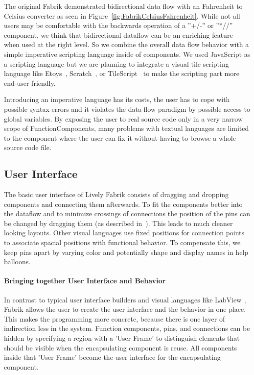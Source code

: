 \documentclass[pdftex, times, 10pt, twocolumn]{article}
\begin{document}
The original Fabrik demonstrated bidirectional data flow with an Fahrenheit to Celsius converter as seen in Figure~\ref{fig:FabrikCelsiusFahrenheit}. While not all users may be comfortable with the backwards operation of a ''+/-'' or ''*//'' component, we think that bidirectional dataflow can be an enriching feature when used at the right level. So we combine the overall data flow behavior with a simple imperative scripting language inside of components.  We used JavaScript as a scripting language but we are planning to integrate a visual tile scripting language like Etoys~\cite{Kay2005SEA}, Scratch~\cite{Maloney2004SSP}, or TileScript~\cite{Warth2008TMS} to make the scripting part more end-user friendly.  

Introducing an imperative language has its costs, the user has to cope with possible syntax errors and it violates the data-flow paradigm by possible access to global variables.  By exposing the user to real source code only in a very narrow scope of FunctionComponents, many problems with textual languages are limited to  the component where the user can fix it without having to browse a whole source code file.  



\subsection{User Interface}
The basic user interface of Lively Fabrik consists of dragging and dropping components and connecting them afterwards. To fit the components better into the dataflow and to minimize crossings of connections the position of the pins can be changed by dragging them (as described in~\cite{Ludolph1988FPE}). This leads to much cleaner looking layouts. Other visual languages use fixed positions for connection points to associate spacial positions with functional behavior. To compensate this, we keep pins apart by varying  color and potentially shape and display names in help balloons.  



\paragraph{Bringing together User Interface and Behavior}
In contrast to typical user interface builders and visual languages like LabView~\cite{Bitter2006LAP}, Fabrik allows the user to create the user interface and the behavior in one place. This makes the programming more concrete, because there is one layer of indirection less in the system. Function components, pins, and connections can be hidden by specifying a region with a 'User Frame' to distinguish elements that should be visible when the encapsulating component is reuse. All components inside that 'User Frame' become the user interface for the encapsulating component.  
\end{document}
